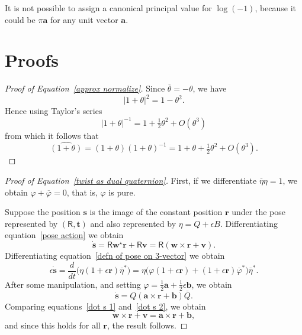 \documentclass[reqno,12pt]{amsart}
\newcommand\starop[1]{#1^\star}
\begin{document}
It is not possible to assign a canonical principal value for $\log(-1)$, because it could be $\pi \bm a$ for any unit vector $\bm a$.

\section{Proofs}
\label{sec proofs}

\begin{proof}[Proof of Equation~\eqref{approx normalize}]  Since $\overline\theta = -\theta$, we have
\begin{equation}
|1+\theta|^2 = 1 - \theta^2.
\end{equation}
Hence using Taylor's series
\begin{equation}
|1+\theta|^{-1} = 1 + \tfrac12 \theta^2 + O(\theta^3)
\end{equation}
from which it follows that
\begin{equation}
\widehat{(1+\theta)} = (1+\theta)(1+\theta)^{-1} = 1 + \theta + \tfrac12 \theta^2 + O(\theta^3)  .
\end{equation}
\end{proof}

\begin{proof}[Proof of Equation~\eqref{twist as dual quaternion}]
First, if we differentiate $\overline\eta \eta = 1$, we obtain $\varphi + \overline \varphi = 0$, that is, $\varphi$ is pure.

Suppose the position $\bm s$ is the image of the constant position $\bm r$ under the pose represented by $(\mathsf R, \bm t)$ and also represented by $\eta = Q + \epsilon B$.  Differentiating equation~\eqref{pose action} we obtain
\begin{equation}
\label{dot s 1}
\dot{\bm s} = \mathsf R \starop{\bm w} \bm r + \mathsf R \bm v = \mathsf R(\bm w \times \bm r + \bm v ).
\end{equation}
Differentiating equation~\eqref{defn of pose on 3-vector} we obtain
\begin{equation}
\epsilon \dot{\bm s}
= \frac d{dt}\bigl(\eta(1+\epsilon \bm r)\overline \eta^*\bigr)
= \eta\bigl(\varphi(1+\epsilon \bm r) + (1+\epsilon\bm r)\overline{\varphi}^*\bigr)\overline \eta^* .
\end{equation}
After some manipulation, and setting $\varphi = \tfrac12\bm a + \tfrac12\epsilon \bm b$, we obtain
\begin{equation}
\label{dot s 2}
\dot{\bm s} = Q(\bm a \times \bm r + \bm b)\overline Q .
\end{equation}
Comparing equations~\eqref{dot s 1} and~\eqref{dot s 2}, we obtain
\begin{equation}
\bm w \times \bm r + \bm v = \bm a \times \bm r + \bm b,
\end{equation}
and since this holds for all $\bm r$, the result follows.
\end{proof}
\end{document}
